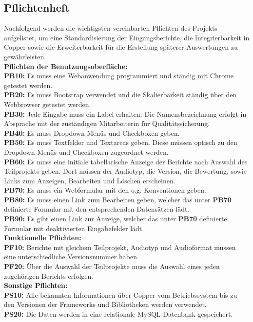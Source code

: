 \subsection{Pflichtenheft}
\label{sec:Pflichtenheft}
Nachfolgend werden die wichtigsten vereinbarten Pflichten des Projekts aufgelistet, um eine Standardisierung der Eingangsberichte, die Integrierbarkeit in Copper sowie die Erweiterbarkeit für die Erstellung späterer Auswertungen zu gewährleisten.\\[1.5ex]
\textbf{Pflichten der Benutzungsoberfläche:}\\[1.5ex]
\textbf{PB10:} Es muss eine Webanwendung programmiert und ständig mit Chrome getestet werden.\\
\textbf{PB20:} Es muss Bootstrap verwendet und die Skalierbarkeit ständig über den Webbrowser getestet werden.\\
\textbf{PB30:} Jede Eingabe muss ein Label erhalten. Die Namensbezeichnung erfolgt in Absprache mit der zuständigen Mitarbeiterin für Qualitätssicherung.\\
\textbf{PB40:} Es muss Dropdown-Menüs und Checkboxen geben.\\
\textbf{PB50:} Es muss Textfelder und Textareas geben. Diese müssen optisch zu den Dropdown-Menüs und Checkboxen zugeordnet werden.\\
\textbf{PB60:} Es muss eine initiale tabellarische Anzeige der Berichte nach Auswahl des Teilprojekts geben. Dort müssen der Audiotyp, die Version, die Bewertung, sowie Links zum Anzeigen, Bearbeiten und Löschen erscheinen.\\
\textbf{PB70:} Es muss ein Webformular mit den o.g. Konventionen geben.\\
\textbf{PB80:} Es muss einen Link zum Bearbeiten geben, welcher das unter \textbf{PB70} definierte Formular mit den entsprechenden Datensätzen lädt.\\
\textbf{PB90:} Es gibt einen Link zur Anzeige, welcher das unter \textbf{PB70} definierte Formular mit deaktivierten Eingabefelder lädt.\\[1.5ex]
\textbf{Funktionelle Pflichten:}\\[1.5ex]
\textbf{PF10:} Berichte mit gleichem Teilprojekt, Audiotyp und Audioformat müssen eine unterschiedliche Versionsnummer haben.\\
\textbf{PF20:} Über die Auswahl der Teilprojekte muss die Auswahl eines jeden zugehörigen Berichts erfolgen.\\[1.5ex]
\textbf{Sonstige Pflichten:}\\[1.5ex]
\textbf{PS10:} Alle bekannten Informationen über Copper vom Betriebssystem bis zu den Versionen der Frameworks und Bibliotheken werden verwendet.\\
\textbf{PS20:} Die Daten werden in eine relationale MySQL-Datenbank gespeichert.

